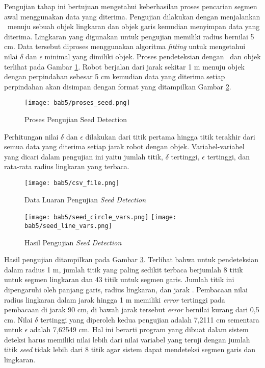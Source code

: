 Pengujian tahap ini bertujuan mengetahui keberhasilan proses pencarian segmen awal menggunakan data yang diterima. Pengujian dilakukan dengan menjalankan \lidar\ menuju sebuah objek lingkaran dan objek garis kemudian menyimpan data yang diterima. Lingkaran yang digunakan untuk pengujian memiliki radius bernilai 5 cm. Data tersebut diproses menggunakan algoritma \textit{fitting} untuk mengetahui nilai $\delta$ dan $\epsilon$ minimal yang dimiliki objek. Proses pendeteksian dengan \lidar\ dan objek terlihat pada Gambar \ref*{fig:Ch05_proses_seed}. Robot berjalan dari jarak sekitar 1 m menuju objek dengan perpindahan sebesar 5 cm kemudian data yang diterima setiap perpindahan akan disimpan dengan format yang ditampilkan Gambar \ref*{fig:Ch05_csv_seed}.
\begin{figure}[H]
    \centering
    \texttt{[image: bab5/proses\_seed.png]}
    \caption{Proses Pengujian Seed Detection}
        \label{fig:Ch05_proses_seed}
\end{figure}
Perhitungan nilai $\delta$ dan $\epsilon$ dilakukan dari titik pertama hingga titik terakhir dari semua data yang diterima setiap jarak robot dengan objek. Variabel-variabel yang dicari dalam pengujian ini yaitu jumlah titik, $\delta$ tertinggi, $\epsilon$ tertinggi, dan rata-rata radius lingkaran yang terbaca.
\begin{figure}[H]
    \centering
    \texttt{[image: bab5/csv\_file.png]}
    \caption{Data Luaran Pengujian \textit{Seed Detection}}
        \label{fig:Ch05_csv_seed}
\end{figure}
\begin{figure}[H]
    \centering
    \texttt{[image: bab5/seed\_circle\_vars.png]}
    \texttt{[image: bab5/seed\_line\_vars.png]}
    \caption{Hasil Pengujian \textit{Seed Detection}}
        \label{fig:Ch05_vars_seed}
\end{figure}

Hasil pengujian ditampilkan pada Gambar \ref*{fig:Ch05_vars_seed}. Terlihat bahwa untuk pendeteksian dalam radius 1 m, jumlah titik yang paling sedikit terbaca berjumlah 8 titik untuk segmen lingkaran dan 43 titik untuk segmen garis. Jumlah titik ini dipengaruhi oleh panjang garis, radius lingkaran, dan jarak \lidar. Pembacaan nilai radius lingkaran dalam jarak hingga 1 m memiliki \textit{error} tertinggi pada pembacaan di jarak 90 cm, di bawah jarak tersebut \textit{error} bernilai kurang dari 0,5 cm. Nilai $\delta$ tertinggi yang diperoleh kedua pengujian adalah 7,2111 cm sementara untuk $\epsilon$ adalah 7,62549 cm. Hal ini berarti program yang dibuat dalam sistem deteksi harus memiliki nilai lebih dari nilai variabel yang teruji dengan jumlah titik \textit{seed} tidak lebih dari 8 titik agar sistem dapat mendeteksi segmen garis dan lingkaran. 

